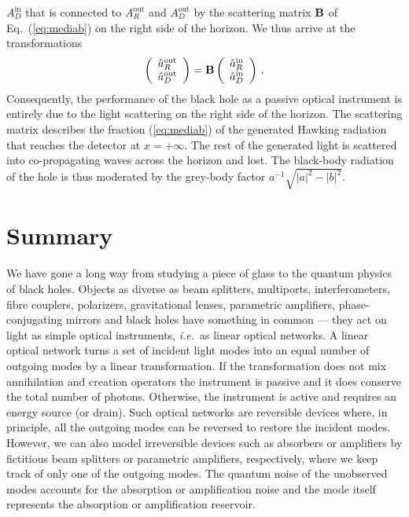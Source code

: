 \documentclass[12pt,amsmath,amssymb]{article}
\def\underline#1{{\bf #1}}
\numberwithin{equation}{section}
\begin{document}
$A_D^\mathrm{in}$
that is connected to $A_R^\mathrm{out}$ and $A_D^\mathrm{out}$
by the scattering matrix $\underline{B}$
of Eq.\ (\ref{eq:mediab}) on the right side of the horizon.
We thus arrive at the transformations
\begin{equation}
\left(
    \begin{array}{c}
     \hat{a}_R^\mathrm{out}  \\
     \hat{a}_D^\mathrm{out}
    \end{array}
\right)
=
\underline{B}
\left(
    \begin{array}{c}
     \hat{a}_R^\mathrm{in}  \\
     \hat{a}_D^\mathrm{in}
    \end{array}
\right)\,.
\end{equation}
Consequently, the
performance of the black hole as a
passive optical instrument is entirely due to
the light scattering on the right side of the horizon.
The scattering matrix describes the fraction
(\ref{eq:mediab}) of the generated
Hawking radiation that reaches the detector at $x=+\infty$.
The rest of the generated light is scattered into
co-propagating waves across the horizon and lost.
The black-body radiation of the hole is thus moderated
by the grey-body factor $a^{-1}\sqrt{|a|^2-|b|^2}$.

\section{Summary}

We have gone a long way from studying a piece of glass to the quantum
physics of black holes. Objects as diverse as beam splitters,
multiports, interferometers, fibre couplers, polarizers, gravitational lenses,
parametric amplifiers, phase-conjugating mirrors and
black holes have something in common ---
they act on light as simple optical instruments, {\it i.e.}\
as linear optical networks.
A linear optical network turns a set of incident light
modes into an equal number of outgoing modes by a linear
transformation. If the transformation does not mix annihilation
and creation operators the instrument is passive and it does conserve
the total number of photons. Otherwise, the instrument is active
and requires an energy source (or drain).
Such optical networks are reversible devices where, in principle,
all the outgoing modes can be reversed to restore the incident modes.
However, we can also model irreversible devices such as
absorbers or amplifiers by fictitious beam splitters or
parametric amplifiers, respectively, where we keep track
of only one of the outgoing modes. The quantum noise of
the unobserved modes accounts for the absorption or amplification
noise and the mode itself represents the absorption or
amplification reservoir.
\end{document}
